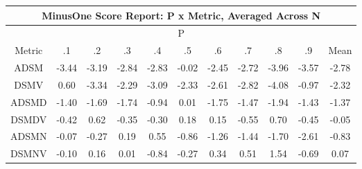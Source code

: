 \documentclass[11pt,a4paper]{report}
\begin{document}
\begin{centering}
\begin{adjustwidth}{-2in}{-1in}
\begin{longtable}{ | c || c | c | c | c | c | c | c | c | c || c |}
\hline
\multicolumn{11}{|c|}{ MinusOne Score Report: P x Metric, Averaged Across N } \\
\hline
\multicolumn{11}{|c|}{ P } \\
\hline
Metric & .1 & .2 & .3 & .4 & .5 & .6 & .7 & .8 & .9 & Mean\\
\hline
\hline
\endhead
ADSM &  \cellcolor[HTML]{FFA7A7} -3.44 &  \cellcolor[HTML]{FFAFAF} -3.19 &  \cellcolor[HTML]{FFB7B7} -2.84 &  \cellcolor[HTML]{FFB7B7} -2.83 &  \cellcolor[HTML]{FFFFFF} -0.02 &  \cellcolor[HTML]{FFBFBF} -2.45 &  \cellcolor[HTML]{FFB7B7} -2.72 &  \cellcolor[HTML]{FF9F9F} -3.96 &  \cellcolor[HTML]{FFA7A7} -3.57 &  \cellcolor[HTML]{FFB7B7} -2.78 \\
DSMV &  \cellcolor[HTML]{EFEFFF} 0.60 &  \cellcolor[HTML]{FFA7A7} -3.34 &  \cellcolor[HTML]{FFC7C7} -2.29 &  \cellcolor[HTML]{FFAFAF} -3.09 &  \cellcolor[HTML]{FFC7C7} -2.33 &  \cellcolor[HTML]{FFBFBF} -2.61 &  \cellcolor[HTML]{FFB7B7} -2.82 &  \cellcolor[HTML]{FF9797} -4.08 &  \cellcolor[HTML]{FFE7E7} -0.97 &  \cellcolor[HTML]{FFC7C7} -2.32 \\
ADSMD &  \cellcolor[HTML]{FFDFDF} -1.40 &  \cellcolor[HTML]{FFD7D7} -1.69 &  \cellcolor[HTML]{FFD7D7} -1.74 &  \cellcolor[HTML]{FFE7E7} -0.94 &  \cellcolor[HTML]{FFFFFF} 0.01 &  \cellcolor[HTML]{FFCFCF} -1.75 &  \cellcolor[HTML]{FFD7D7} -1.47 &  \cellcolor[HTML]{FFCFCF} -1.94 &  \cellcolor[HTML]{FFD7D7} -1.43 &  \cellcolor[HTML]{FFDFDF} -1.37 \\
DSMDV &  \cellcolor[HTML]{FFF7F7} -0.42 &  \cellcolor[HTML]{EFEFFF} 0.62 &  \cellcolor[HTML]{FFF7F7} -0.35 &  \cellcolor[HTML]{FFF7F7} -0.30 &  \cellcolor[HTML]{F7F7FF} 0.18 &  \cellcolor[HTML]{FFFFFF} 0.15 &  \cellcolor[HTML]{FFEFEF} -0.55 &  \cellcolor[HTML]{EFEFFF} 0.70 &  \cellcolor[HTML]{FFF7F7} -0.45 &  \cellcolor[HTML]{FFFFFF} -0.05 \\
ADSMN &  \cellcolor[HTML]{FFFFFF} -0.07 &  \cellcolor[HTML]{FFF7F7} -0.27 &  \cellcolor[HTML]{F7F7FF} 0.19 &  \cellcolor[HTML]{EFEFFF} 0.55 &  \cellcolor[HTML]{FFE7E7} -0.86 &  \cellcolor[HTML]{FFDFDF} -1.26 &  \cellcolor[HTML]{FFD7D7} -1.44 &  \cellcolor[HTML]{FFD7D7} -1.70 &  \cellcolor[HTML]{FFBFBF} -2.61 &  \cellcolor[HTML]{FFE7E7} -0.83 \\
DSMNV &  \cellcolor[HTML]{FFFFFF} -0.10 &  \cellcolor[HTML]{FFFFFF} 0.16 &  \cellcolor[HTML]{FFFFFF} 0.01 &  \cellcolor[HTML]{FFE7E7} -0.84 &  \cellcolor[HTML]{FFF7F7} -0.27 &  \cellcolor[HTML]{F7F7FF} 0.34 &  \cellcolor[HTML]{EFEFFF} 0.51 &  \cellcolor[HTML]{D7D7FF} 1.54 &  \cellcolor[HTML]{FFEFEF} -0.69 &  \cellcolor[HTML]{FFFFFF} 0.07 \\

\end{longtable}
\end{adjustwidth}
\end{centering}
\end{document}
